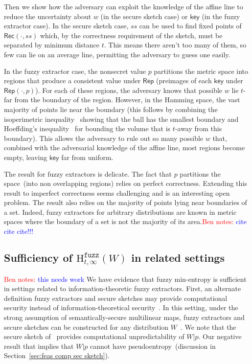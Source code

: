 \documentclass[11pt]{article}
\newcommand{\secref}[1]{\mbox{Section~\ref{#1}}}
\newcommand{\class}[1]{{\ensuremath{\mathsf{#1}}}}
\newcommand{\key}{\ensuremath{\class{key}}\xspace}
\newcommand{\rep}{\ensuremath{\class{Rep}}\xspace}
\newcommand{\rec}{\ensuremath{\class{Rec}}\xspace}
\newcommand{\Hfuzz}{\mathrm{H}^{\mathtt{fuzz}}_{t,\infty}}
\newcommand{\authnote}[2]{{\textcolor{red}{\textsf{#1 notes: }\textcolor{blue}{ #2}}\marginpar{\textcolor{red}{\textbf{!!!!!}}}}}
\newcommand{\authnote}[2]{}
\newcommand{\bnote}[1]{{\authnote{Ben}{#1}}}
\begin{document}
Then we show how the adversary can exploit the knowledge of the affine line to reduce the uncertainty about $w$ (in the secure sketch case) or $\key$ (in the fuzzy extractor case). 
In the secure sketch case, $ss$ can be used to find fixed points of $\rec(\cdot, ss)$ which, by the correctness requirement of the sketch, must be separated by minimum distance $t$. This means there aren't too many of them, so few can lie on an average line, permitting the adversary to guess one easily.

In the fuzzy extractor case, the nonsecret value $p$ partitions the metric space into regions that produce a consistent value under $\rep$ (preimages of each $\key$ under $\rep(\cdot, p)$).  For each of these regions, the adversary knows that possible $w$ lie $t$-far from the boundary of the region.  However, in the Hamming space, the vast majority of points lie near the boundary (this follows by combining the isoperimetric inequality~\cite{harper1966optimal} showing that the ball has the smallest boundary and Hoeffding's inequality~\cite{hoeffding1963probability} for bounding the volume that is $t$-away from this boundary).  This allows the adversary to rule out so many possible $w$ that, combined with the adversarial knowledge of the affine line, most regions become empty, leaving $\key$ far from uniform.

The result for fuzzy extractors is delicate.  The fact that $p$ partitions the space~(into non overlapping regions) relies on perfect correctness.  Extending this result to imperfect correctness seems challenging and is an interesting open problem.
The result also relies on the majority of points lying near boundaries of a set. Indeed, fuzzy extractors for arbitrary distributions are known in metric spaces where the boundary of a set is not the majority of its area.\bnote{cite cite cite!!!}

\subsection{Sufficiency of $\Hfuzz(W)$ in related settings}
\label{sec:related settings}
\bnote{this needs work}
We have evidence that fuzzy min-entropy is sufficient in settings related to information-theoretic fuzzy extractors.  
First, an alternate definition fuzzy extractors and secure sketches may provide computational security instead of information-theoretical security~\cite{fuller2013computational}.  In this setting, under the strong assumption of semantically-secure multilinear maps, fuzzy extractors and secure sketches can be constructed for any distribution $W$~\cite{BitanskyCKP14}.  We note that the secure sketch of~\cite{BitanskyCKP14} provides computational unpredictability of $W |p$.  Our negative result that implies that $W|p$ cannot have pseudoentropy~(discussion in \secref{sec:feas comp sec sketch}).
\end{document}
